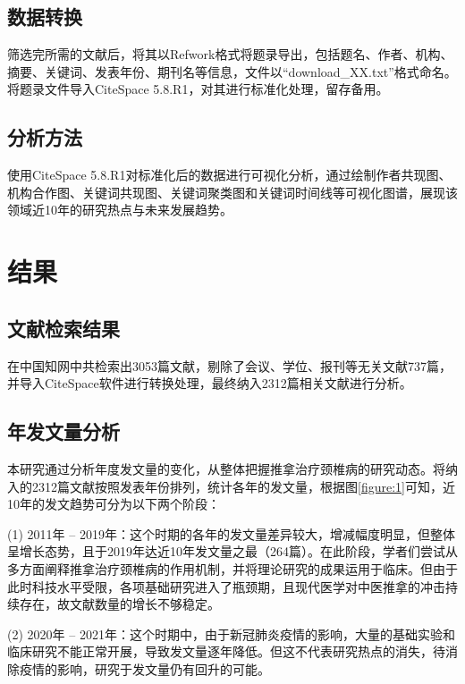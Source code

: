 \documentclass[lang=cn,11pt,a4paper,cite=super,AutoFakeBold,chinesefont=founder]{elegantpaper}
\begin{document}
\subsection{数据转换}

筛选完所需的文献后，将其以Refwork格式将题录导出，包括题名、作者、机构、摘要、关键词、发表年份、期刊名等信息，文件以“download\_XX.txt”格式命名。将题录文件导入CiteSpace 5.8.R1，对其进行标准化处理，留存备用。

\subsection{分析方法}

使用CiteSpace 5.8.R1对标准化后的数据进行可视化分析，通过绘制作者共现图、机构合作图、关键词共现图、关键词聚类图和关键词时间线等可视化图谱，展现该领域近10年的研究热点与未来发展趋势。

\section{结果}

\subsection{文献检索结果}

在中国知网中共检索出3053篇文献，剔除了会议、学位、报刊等无关文献737篇，并导入CiteSpace软件进行转换处理，最终纳入2312篇相关文献进行分析。    %

\subsection{年发文量分析} %

本研究通过分析年度发文量的变化，从整体把握推拿治疗颈椎病的研究动态。将纳入的2312篇文献按照发表年份排列，统计各年的发文量，根据图\ref{figure:1}可知，近10年的发文趋势可分为以下两个阶段：

(1) 2011年 -- 2019年：这个时期的各年的发文量差异较大，增减幅度明显，但整体呈增长态势，且于2019年达近10年发文量之最（264篇）。在此阶段，学者们尝试从多方面阐释推拿治疗颈椎病的作用机制，并将理论研究的成果运用于临床。但由于此时科技水平受限，各项基础研究进入了瓶颈期，且现代医学对中医推拿的冲击持续存在，故文献数量的增长不够稳定。

(2) 2020年 -- 2021年：这个时期中，由于新冠肺炎疫情的影响，大量的基础实验和临床研究不能正常开展，导致发文量逐年降低。但这不代表研究热点的消失，待消除疫情的影响，研究于发文量仍有回升的可能。
\end{document}
